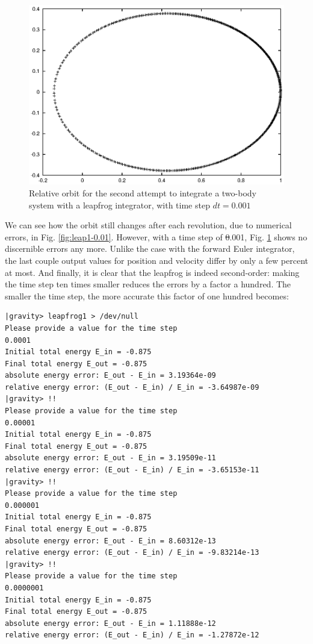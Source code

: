 \begin{figure}[htb]
\centering
\includegraphics[width=4.5in]{chap4/leapfrog1_0.001.ps}
\caption[Two-body orbit with a leapfrog integrator, time step $dt = 0.001$]
{Relative orbit for the second attempt to integrate a two-body system with a
leapfrog integrator, with time step $dt = 0.001$}
\label{fig:leap1-0.001}
\end{figure}

We can see how the orbit still changes after each revolution, due to
numerical errors, in Fig. \ref{fig:leap1-0.01}.  However, with a time
step of {\st 0.001}, Fig. \ref{fig:leap1-0.001} shows no discernible
errors any more.  Unlike the case with the forward Euler integrator,
the last couple output values for position and velocity differ by only
a few percent at most.  And finally, it is clear that the leapfrog is
indeed second-order: making the time step ten times smaller reduces
the errors by a factor a hundred.  The smaller the time step, the more
accurate this factor of one hundred becomes:

\begin{small}
\begin{verbatim}
|gravity> leapfrog1 > /dev/null
Please provide a value for the time step
0.0001
Initial total energy E_in = -0.875
Final total energy E_out = -0.875
absolute energy error: E_out - E_in = 3.19364e-09
relative energy error: (E_out - E_in) / E_in = -3.64987e-09
|gravity> !!
Please provide a value for the time step
0.00001
Initial total energy E_in = -0.875
Final total energy E_out = -0.875
absolute energy error: E_out - E_in = 3.19509e-11
relative energy error: (E_out - E_in) / E_in = -3.65153e-11
|gravity> !!
Please provide a value for the time step
0.000001
Initial total energy E_in = -0.875
Final total energy E_out = -0.875
absolute energy error: E_out - E_in = 8.60312e-13
relative energy error: (E_out - E_in) / E_in = -9.83214e-13
|gravity> !!
Please provide a value for the time step
0.0000001
Initial total energy E_in = -0.875
Final total energy E_out = -0.875
absolute energy error: E_out - E_in = 1.11888e-12
relative energy error: (E_out - E_in) / E_in = -1.27872e-12
\end{verbatim}
\end{small}

